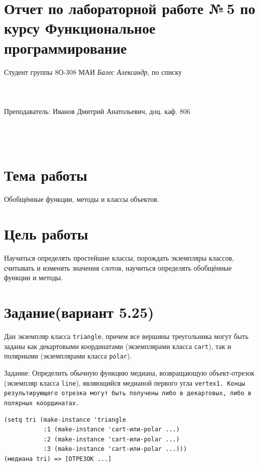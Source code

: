 \documentclass[12pt]{article}
\begin{document}
\section*{Отчет по лабораторной работе №\,5
по курсу \guillemotleft  Функциональное программирование\guillemotright}
\begin{flushright}
Студент группы 8О-308 МАИ \textit{Балес Александр},  по списку \\
 \\
 \\
\ \\
Преподаватель: Иванов Дмитрий Анатольевич, доц. каф. 806 \\
 \\
 \\
 \\

\end{flushright}

\section{Тема работы}
Обобщённые функции, методы и классы объектов.

\section{Цель работы}
Научиться определять простейшие классы, порождать экземпляры классов, считывать и изменять значения слотов, научиться определять обобщённые функции и методы.

\section{Задание(вариант 5.25)}
Дан экземпляр класса {\color{blue}\tt{triangle}}, причем все вершины треугольника могут быть заданы как декартовыми координатами (экземплярами класса {\color{blue}\tt{cart}}), так и полярными (экземплярами класса {\color{blue}\tt{polar}}).

Задание: Определить обычную функцию медиана, возвращающую объект-отрезок (экземпляр класса {\color{blue}\tt{line}}), являющийся медианой первого угла \tt{vertex1}. Концы результирующего отрезка могут быть получены либо в декартовых, либо в полярных координатах.
\begin{verbatim}
(setq tri (make-instance 'triangle
           :1 (make-instance 'cart-или-polar ...)
           :2 (make-instance 'cart-или-polar ...)
           :3 (make-instance 'cart-или-polar ...)))
(медиана tri) => [ОТРЕЗОК ...]
\end{verbatim}
\end{document}
